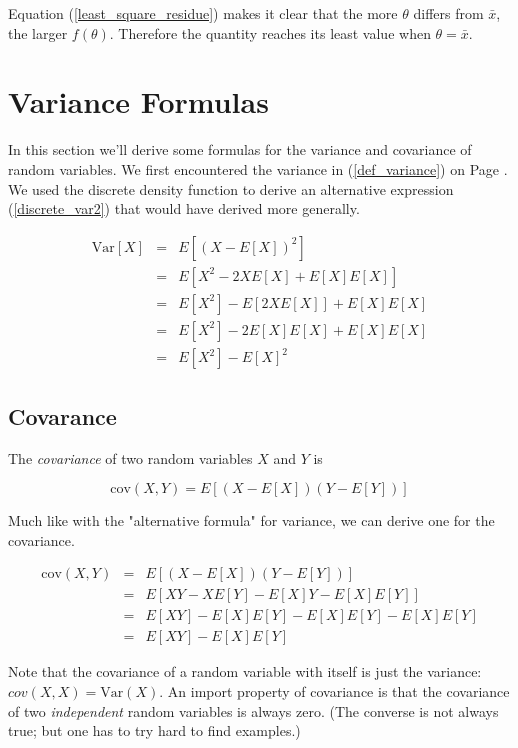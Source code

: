 \documentclass[]{article}
\begin{document}
Equation (\ref{least_square_residue}) makes it clear that
the more $\theta$ differs from $\bar{x}$, the larger $f(\theta)$.
Therefore the quantity reaches its least value
when $\theta = \bar{x}$.


\section{Variance Formulas}

In this section we'll derive some formulas for the variance
and covariance of random variables.  We first encountered the
variance in (\ref{def_variance}) on Page \pageref{def_variance}.
We used the discrete density function to derive an alternative
expression (\ref{discrete_var2}) that would have derived more
generally.

\begin{eqnarray*}
\mbox{Var}[X] &= &E\left[(X - E[X])^2 \right] \\
   &= & E \left[ X^2 - 2XE[X] + E[X] E[X] \right] \\
   &= & E[X^2] - E\left[2XE[X]\right] + E[X] E[X] \\
   &= & E[X^2] - 2 E[X] E[X] + E[X] E[X] \\
   &= & E[X^2] - E[X]^2
\end{eqnarray*}

\subsection{Covarance}

The \emph{covariance} of two random variables $X$ and $Y$ is

\begin{equation} \label{def_covariance}
\mbox{cov}(X,Y) = E\left[(X - E[X])(Y - E[Y])\right]
\end{equation}

Much like with the "alternative formula" for variance, we
can derive one for the covariance.

\begin{eqnarray}
\mbox{cov}(X,Y) &= &E\left[(X - E[X])(Y - E[Y])\right] \nonumber \\
  &= &E\left[ XY - X E[Y] - E[X] Y - E[X] E[Y] \right] \nonumber \\
  &= &E[XY] - E[X] E[Y] - E[X] E[Y] - E[X] E[Y] \nonumber \\
  &= &E[XY] - E[X] E[Y] \label{cov2}
\end{eqnarray}

Note that the covariance of a random variable with
itself is just the variance: $cov(X,X) = \mbox{Var}(X)$.
An import property of covariance is that the covariance
of two \emph{independent} random variables is always zero.
(The converse is not always true; but one has to try hard
to find examples.)
\end{document}
